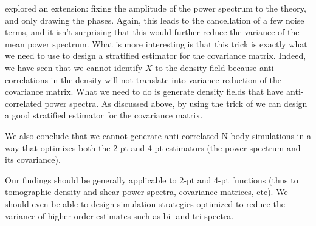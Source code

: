 \documentclass{aastex6}
\begin{document}
\cite{AnguloPontzen2016} explored an extension: fixing the amplitude of the power spectrum to the theory, and only drawing the phases. Again, this leads to the cancellation of a few noise terms,  and it isn't surprising that this would further reduce the variance of the mean power spectrum.
What is more interesting is that this trick is exactly what we need to use to design a stratified estimator for the covariance matrix. 
Indeed, we have seen that we cannot identify $X$ to the density field because anti-correlations in the density will not translate into variance reduction of the covariance matrix.
What we need to do is generate density fields that have anti-correlated power spectra. As discussed above, by using the trick of \cite{AnguloPontzen2016} we can design a good stratified estimator for the covariance matrix.

We also conclude that we cannot generate anti-correlated N-body simulations in a way that optimizes both the 2-pt and 4-pt estimators (the power spectrum and its covariance).

Our findings should be generally applicable to 2-pt and 4-pt functions (thus to tomographic density and shear power spectra, covariance matrices, etc). We should even be able to design simulation strategies optimized to reduce the variance of higher-order estimates such as bi- and tri-spectra.
\end{document}
